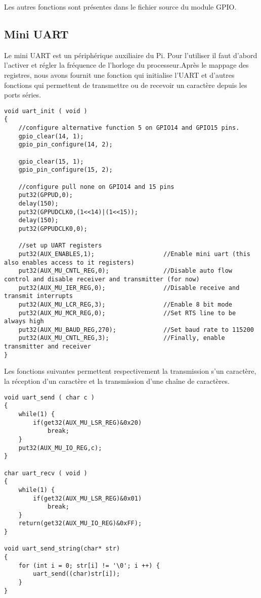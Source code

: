 \documentclass[12pt,a4paper,oneside]{book}
\begin{document}
Les autres fonctions sont présentes dans le fichier source du module GPIO.

\subsection{Mini UART}
Le mini UART est un périphérique auxiliaire du Pi. Pour l'utiliser il faut d'abord l'activer et régler la fréquence de l'horloge du processeur.Après le mappage des registres, nous avons fournit une fonction qui initialise l'UART et d'autres fonctions qui permettent de transmettre ou de recevoir un caractère depuis les ports séries.\\
\begin{lstlisting}
void uart_init ( void )
{
	//configure alternative function 5 on GPIO14 and GPIO15 pins. 
	gpio_clear(14, 1);
	gpio_pin_configure(14, 2);

	gpio_clear(15, 1);
	gpio_pin_configure(15, 2);

	//configure pull none on GPIO14 and 15 pins
	put32(GPPUD,0);
	delay(150);
	put32(GPPUDCLK0,(1<<14)|(1<<15));
	delay(150);
	put32(GPPUDCLK0,0);

	//set up UART registers
	put32(AUX_ENABLES,1);                   //Enable mini uart (this also enables access to it registers)
	put32(AUX_MU_CNTL_REG,0);               //Disable auto flow control and disable receiver and transmitter (for now)
	put32(AUX_MU_IER_REG,0);                //Disable receive and transmit interrupts
	put32(AUX_MU_LCR_REG,3);                //Enable 8 bit mode
	put32(AUX_MU_MCR_REG,0);                //Set RTS line to be always high
	put32(AUX_MU_BAUD_REG,270);             //Set baud rate to 115200
	put32(AUX_MU_CNTL_REG,3);               //Finally, enable transmitter and receiver
}
\end{lstlisting}

Les fonctions suivantes permettent respectivement la transmission s'un caractère, la réception d'un caractère et la transmission d'une chaîne de caractères.\\
\begin{lstlisting}
void uart_send ( char c )
{
	while(1) {
		if(get32(AUX_MU_LSR_REG)&0x20) 
			break;
	}
	put32(AUX_MU_IO_REG,c);
}

char uart_recv ( void )
{
	while(1) {
		if(get32(AUX_MU_LSR_REG)&0x01) 
			break;
	}
	return(get32(AUX_MU_IO_REG)&0xFF);
}

void uart_send_string(char* str)
{
	for (int i = 0; str[i] != '\0'; i ++) {
		uart_send((char)str[i]);
	}
}
\end{lstlisting}
\end{document}
